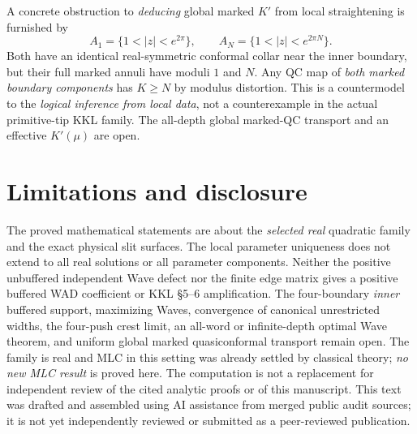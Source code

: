 A concrete obstruction
to \emph{deducing}
global marked $K'$
from local straightening
is furnished by
\[
 A_1=\{1<|z|<e^{2\pi}\},\qquad
 A_N=\{1<|z|<e^{2\pi N}\}.
\]
Both have an identical
real-symmetric conformal
collar near the inner
boundary, but their
full marked annuli
have moduli $1$ and
$N$.  Any QC map of
\emph{both marked
boundary components}
has $K\ge N$ by
modulus distortion.
This is a countermodel
to the \emph{logical
inference from local
data}, not a
counterexample in the
actual primitive-tip
KKL family.
The all-depth global
marked-QC transport
and an effective
$K'(\mu)$ are open.

\section{Limitations and disclosure}
The proved mathematical
statements are about
the \emph{selected
real} quadratic family
and the exact physical
slit surfaces.  The
local parameter
uniqueness does not
extend to all real
solutions or all
parameter components.
Neither the positive
unbuffered independent
Wave defect nor the
finite edge matrix
gives a positive
buffered WAD coefficient
or KKL \S5--6
amplification.  The
four-boundary
\emph{inner} buffered
support, maximizing
Waves, convergence of
canonical unrestricted
widths, the
four-push crest limit,
an all-word or
infinite-depth optimal
Wave theorem, and
uniform global
marked quasiconformal
transport remain open.
The family is real
and MLC in this
setting was already
settled by classical
theory; \emph{no
new MLC result} is
proved here.
The computation is
not a replacement
for independent
review of the
cited analytic proofs
or of this manuscript.
This text was
drafted and assembled
using AI assistance
from merged public
audit sources; it is
not yet independently
reviewed or
submitted as a
peer-reviewed
publication.
